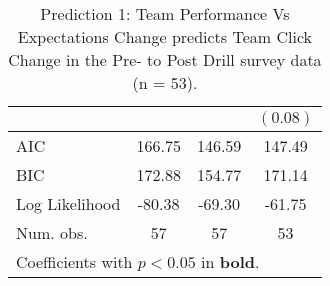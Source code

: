 \begin{table}
\begin{center}
\begin{tabular}{l c c c }
                                                        &          &                       & $(0.08)$              \\
\midrule
AIC                                                     & 166.75   & 146.59                & 147.49                \\
BIC                                                     & 172.88   & 154.77                & 171.14                \\
Log Likelihood                                          & -80.38   & -69.30                & -61.75                \\
Num. obs.                                               & 57       & 57                    & 53                    \\
\bottomrule
\multicolumn{4}{l}{\scriptsize{Coefficients with $p < 0.05$ in \textbf{bold}.}}
\end{tabular}
\caption{Prediction 1: Team Performance Vs Expectations Change predicts Team Click Change in the Pre- to Post Drill survey data (n = 53).}
\label{tab:TEM21groupExpPerfClickChange}
\end{center}
\end{table}
